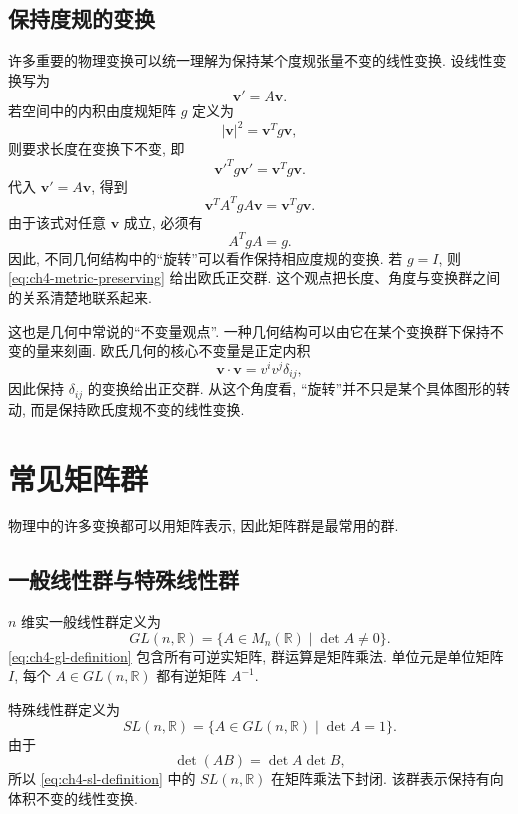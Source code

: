 \subsection{保持度规的变换}

许多重要的物理变换可以统一理解为保持某个度规张量不变的线性变换. 设线性变换写为
\[
\bm{v}'=A\bm{v}.
\]
若空间中的内积由度规矩阵 $g$ 定义为
\[
|\bm{v}|^2=\bm{v}^Tg\bm{v},
\]
则要求长度在变换下不变, 即
\[
\bm{v}'^Tg\bm{v}'=\bm{v}^Tg\bm{v}.
\]
代入 $\bm{v}'=A\bm{v}$, 得到
\[
\bm{v}^TA^TgA\bm{v}=\bm{v}^Tg\bm{v}.
\]
由于该式对任意 $\bm{v}$ 成立, 必须有
\begin{equation}
\label{eq:ch4-metric-preserving}
A^TgA=g.
\end{equation}
因此, 不同几何结构中的“旋转”可以看作保持相应度规的变换. 若 $g=I$, 则 \eqref{eq:ch4-metric-preserving} 给出欧氏正交群. 这个观点把长度、角度与变换群之间的关系清楚地联系起来. 

这也是几何中常说的“不变量观点”. 一种几何结构可以由它在某个变换群下保持不变的量来刻画. 欧氏几何的核心不变量是正定内积
\[
\bm{v}\cdot\bm{v}=v^iv^j\delta_{ij},
\]
因此保持 $\delta_{ij}$ 的变换给出正交群. 从这个角度看, “旋转”并不只是某个具体图形的转动, 而是保持欧氏度规不变的线性变换. 

\section{常见矩阵群}

物理中的许多变换都可以用矩阵表示, 因此矩阵群是最常用的群. 

\subsection{一般线性群与特殊线性群}

$n$ 维实一般线性群定义为
\begin{equation}
\label{eq:ch4-gl-definition}
GL(n,\mathbb{R})
=
\{A\in M_n(\mathbb{R})\mid \det A\neq 0\}.
\end{equation}
\eqref{eq:ch4-gl-definition} 包含所有可逆实矩阵, 群运算是矩阵乘法. 单位元是单位矩阵 $I$, 每个 $A\in GL(n,\mathbb{R})$ 都有逆矩阵 $A^{-1}$. 

特殊线性群定义为
\begin{equation}
\label{eq:ch4-sl-definition}
SL(n,\mathbb{R})
=
\{A\in GL(n,\mathbb{R})\mid \det A=1\}.
\end{equation}
由于
\[
\det(AB)=\det A\det B,
\]
所以 \eqref{eq:ch4-sl-definition} 中的 $SL(n,\mathbb{R})$ 在矩阵乘法下封闭. 该群表示保持有向体积不变的线性变换. 

